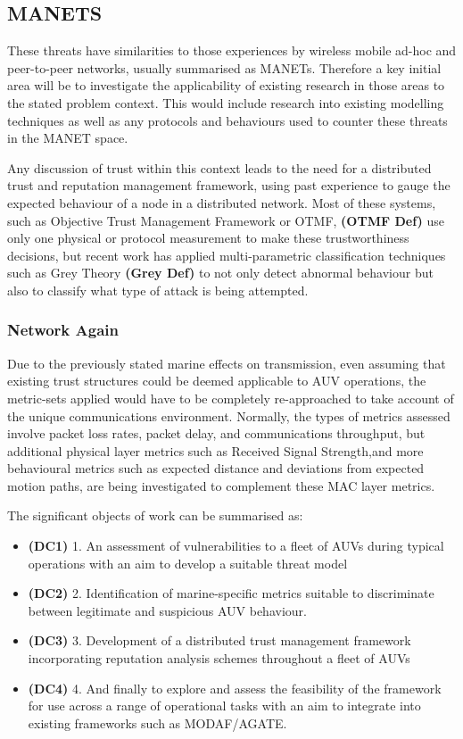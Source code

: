 \documentclass[oneside,11pt,a4paper]{Latex/Classes/PhDthesisPSnPDF}
\begin{document}
\begin{doublespace}
\subsection{MANETS}  These threats have similarities to those experiences by wireless
mobile ad-hoc and peer-to-peer networks, usually summarised as MANETs. Therefore
a key initial area will be to investigate the applicability of existing research
in those areas to the stated problem context. This would include research into
existing modelling techniques as well as any protocols and behaviours used to
counter these threats in the MANET space.

Any discussion of trust within this context leads to the need for a distributed
trust and reputation management framework, using past experience to gauge the
expected behaviour of a node in a distributed network. Most of these systems,
such as Objective Trust Management Framework or OTMF, \textbf{(OTMF Def)} use
only one physical or protocol measurement to make these trustworthiness decisions, but recent work has applied multi-parametric classification
techniques such as Grey Theory \textbf{(Grey Def)}
to not only detect abnormal behaviour but also to classify what type of attack
is being attempted.

\subsubsection{Network Again} 
Due to the previously stated marine effects on transmission,
even assuming that existing trust structures could be deemed applicable to AUV
operations, the metric-sets applied would have to be completely re-approached to
take account of the unique communications environment. Normally, the types of
metrics assessed involve packet loss rates, packet delay, and communications
throughput, but additional physical layer metrics such as Received Signal
Strength,and more behavioural metrics such as expected distance and deviations
from expected motion paths, are being investigated to complement these MAC layer
metrics.

The significant objects of work can be summarised as: 
\begin{itemize}
	\item\textbf{(DC1)}  1. An assessment of vulnerabilities to a fleet of AUVs
	during typical operations with an aim to develop a suitable threat model
	\item\textbf{(DC2)}  2. Identification of marine-specific metrics 
	suitable to discriminate between legitimate and suspicious AUV behaviour.
	\item\textbf{(DC3)}  3. Development of a distributed trust management framework
	incorporating reputation analysis schemes throughout a fleet of AUVs
	\item\textbf{(DC4)}  4. And finally to explore and assess the feasibility of
	the framework for use across a range of operational tasks with an aim to integrate
	into existing frameworks such as MODAF/AGATE.
\end{itemize}


\end{doublespace}
\end{document}
